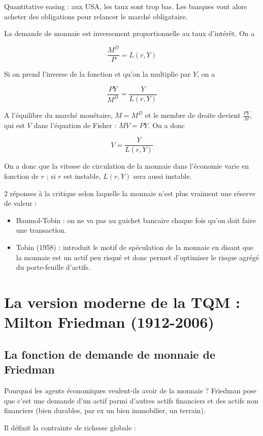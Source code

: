 	
	Quantitative easing : aux USA, les taux sont trop bas. Les banques vont alors acheter des obligations pour relancer le marché obligataire. 
	
	La demande de monnaie est inversement proportionnelle au taux d'intérêt. On a
	
	$$\frac{M^D}{P} = L(r, Y)$$
	
	
	Si on prend l'inverse de la fonction et qu'on la multiplie par $Y$, on a
	
	$$\frac{PY}{M^D} = \frac{Y}{L(r, Y)}$$
	
	A l'équilibre du marché monétaire, $M = M^D$ et le membre de droite devient $\frac{PY}{M}$, qui est $V$ dans l'équation de Fisher : $MV = PY$. On a donc
	
	$$V = \frac{Y}{L(r, Y)}$$
	
	On a donc que la vitesse de circulation de la monnaie dans l'économie varie en fonction de $r$ ; si $r$ est instable, $L(r, Y)$ sera aussi instable.
	
	2 réponses à la critique selon laquelle la monnaie n'est plus vraiment une réserve de valeur :
	
	\begin{itemize}
		\item Baumol-Tobin : on ne va pas au guichet bancaire chaque fois qu'on doit faire une transaction.
		\item Tobin (1958) : introduit le motif de spéculation de la monnaie en disant que la monnaie est un actif peu risqué et donc permet d'optimiser le risque agrégé du porte-feuille d'actifs.
	\end{itemize}
	
	
\section{La version moderne de la TQM : Milton Friedman (1912-2006)}

	\subsection{La fonction de demande de monnaie de Friedman}
	
	Pourquoi les agents économiques veulent-ils avoir de la monnaie ? Friedman pose que c'est une demande d'un actif parmi d'autres actifs financiers et des actifs non financiers (bien durables, par ex un bien immobilier, un terrain).
	
	Il définit la contrainte de richesse globale : 
	
